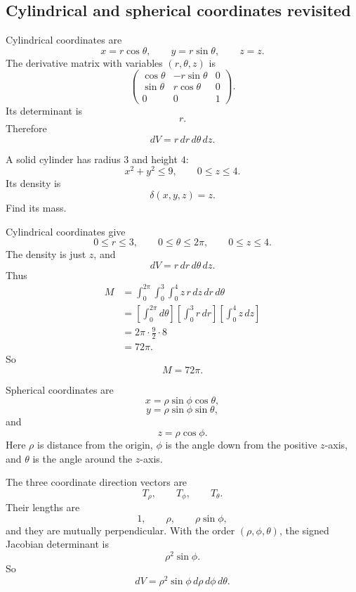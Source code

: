 \subsection{Cylindrical and spherical coordinates revisited}

Cylindrical coordinates are
\[
    x=r\cos\theta,
    \qquad
    y=r\sin\theta,
    \qquad
    z=z.
\]
The derivative matrix with variables \((r,\theta,z)\) is
\[
    \begin{pmatrix}
        \cos\theta&-r\sin\theta&0\\
        \sin\theta&r\cos\theta&0\\
        0&0&1
    \end{pmatrix}.
\]
Its determinant is
\[
    r.
\]
Therefore
\[
\boxed{
    dV=r\,dr\,d\theta\,dz.
}
\]

\begin{example}
A solid cylinder has radius \(3\) and height \(4\):
\[
    x^2+y^2\le9,\qquad 0\le z\le4.
\]
Its density is
\[
    \delta(x,y,z)=z.
\]
Find its mass.

Cylindrical coordinates give
\[
    0\le r\le3,
    \qquad
    0\le\theta\le2\pi,
    \qquad
    0\le z\le4.
\]
The density is just \(z\), and
\[
    dV=r\,dr\,d\theta\,dz.
\]
Thus
\[
\begin{aligned}
    M
    &=
    \int_0^{2\pi}\int_0^3\int_0^4
    z\,r\,dz\,dr\,d\theta\\
    &=
    \left[\int_0^{2\pi}d\theta\right]
    \left[\int_0^3 r\,dr\right]
    \left[\int_0^4 z\,dz\right]\\
    &=
    2\pi\cdot\frac92\cdot8\\
    &=
    72\pi.
\end{aligned}
\]
So
\[
\boxed{
    M=72\pi.
}
\]
\end{example}

Spherical coordinates are
\[
    x=\rho\sin\phi\cos\theta,
\]
\[
    y=\rho\sin\phi\sin\theta,
\]
and
\[
    z=\rho\cos\phi.
\]
Here \(\rho\) is distance from the origin, \(\phi\) is the angle down from the positive
\(z\)-axis, and \(\theta\) is the angle around the \(z\)-axis.

The three coordinate direction vectors are
\[
    T_\rho,\qquad T_\phi,\qquad T_\theta.
\]
Their lengths are
\[
    1,\qquad \rho,\qquad \rho\sin\phi,
\]
and they are mutually perpendicular.  With the order \((\rho,\phi,\theta)\), the signed
Jacobian determinant is
\[
    \rho^2\sin\phi.
\]
So
\[
\boxed{
    dV=\rho^2\sin\phi\,d\rho\,d\phi\,d\theta.
}
\]

